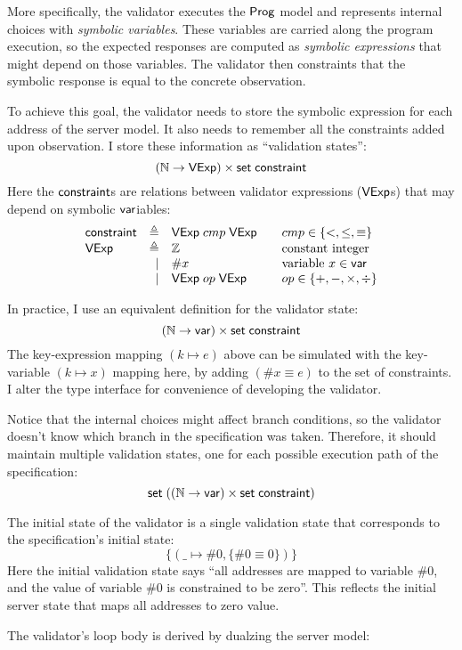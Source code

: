 More specifically, the validator executes the $\mathsf{Prog}$ model and represents
internal choices with {\em symbolic variables}.  These variables are carried
along the program execution, so the expected responses are computed as {\em
  symbolic expressions} that might depend on those variables.  The validator
then constraints that the symbolic response is equal to the concrete
observation.

To achieve this goal, the validator needs to store the symbolic expression for
each address of the server model.  It also needs to remember all the constraints
added upon observation.  I store these information as ``validation states'':
\[(\mathbb N\to\mathsf{VExp})\times\mathsf{set}\;\mathsf{constraint}\]
Here the $\mathsf{constraint}$s are relations between validator expressions ($\mathsf{VExp}$s)
that may depend on symbolic $\mathsf{var}$iables:
\[\begin{array}{lrl@{\qquad}l}
\constraint&\triangleq&\Vexp\ccmp\Vexp&cmp\in\{<,\le,\equiv\}\\
\Vexp&\triangleq&\Int&\text{constant integer}\\
&\mid&\#x&\text{variable }x\in\Var\\
&\mid&\Vexp\oop\Vexp&op\in\{+,-,\times,\div\}\\
\end{array}\]

In practice, I use an equivalent definition for the validator state:
\[(\mathbb N\to\mathsf{var})\times\mathsf{set}\;\mathsf{constraint}\]
The key-expression mapping $(k\mapsto e)$ above can be simulated with the
key-variable $(k\mapsto x)$ mapping here, by adding $(\#x\equiv e)$ to the set
of constraints.  I alter the type interface for convenience of developing the
validator.

Notice that the internal choices might affect branch conditions, so the
validator doesn't know which branch in the specification was taken.  Therefore,
it should maintain multiple validation states, one for each possible execution
path of the specification:
\[\mathsf{set}\;((\mathbb N\to\mathsf{var})\times\mathsf{set}\;\mathsf{constraint})\]

The initial state of the validator is a single validation state that corresponds
to the specification's initial state:
\[\{(\_\mapsto\#0,\{\#0\equiv0\})\}\]
Here the initial validation state says ``all addresses are mapped to variable
$\#0$, and the value of variable $\#0$ is constrained to be zero''.  This
reflects the initial server state that maps all addresses to zero value.

The validator's loop body is derived by dualzing the server model:

